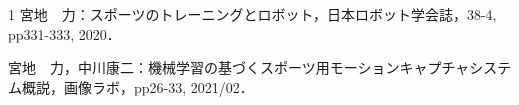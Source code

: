 \begin{発表}{1}
宮地　力：スポーツのトレーニングとロボット，日本ロボット学会誌，38-4, pp331-333, 2020．

宮地　力，中川康二：機械学習の基づくスポーツ用モーションキャプチャシステム概説，画像ラボ，pp26-33, 2021/02．

\end{発表}